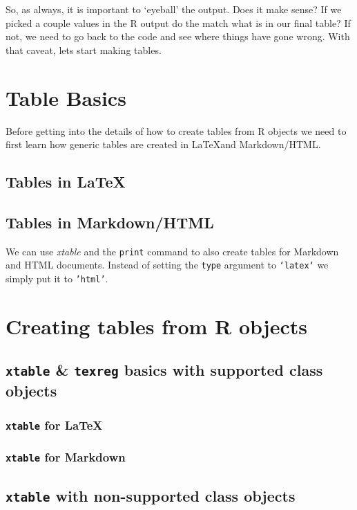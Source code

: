 So, as always, it is important to `eyeball' the output. Does it make
sense? If we picked a couple values in the R output do the
match what is in our final table? If not, we need to go back to the code
and see where things have gone wrong. With that caveat, lets start
making tables.

\section{Table Basics}

Before getting into the details of how to create tables from R objects we need to first learn how generic tables are created in \LaTeX and Markdown/HTML.

\subsection{Tables in \LaTeX}

\subsection{Tables in Markdown/HTML}

We can use {\emph{xtable}} and the \texttt{print} command to also create tables for Markdown and HTML documents. Instead of setting the \texttt{type} argument to \texttt{`latex`} we simply put it to \texttt{'html'}.

\section{Creating tables from R objects}

\subsection{\texttt{xtable} \& \texttt{texreg} basics with supported
class objects}

\subsubsection{\texttt{xtable} for \LaTeX}

\subsubsection{\texttt{xtable} for Markdown}

\subsection{\texttt{xtable} with non-supported class objects}

